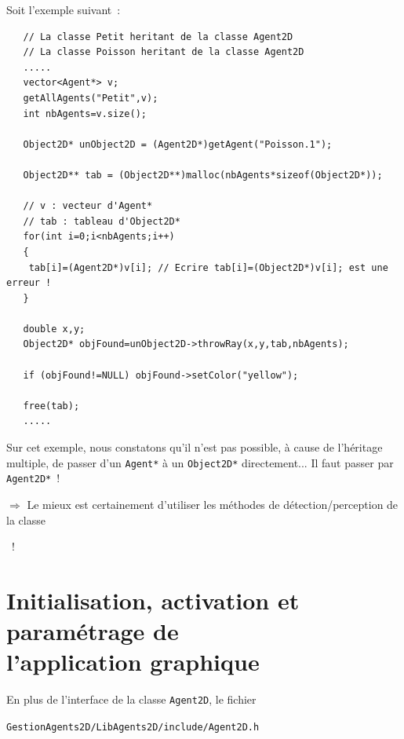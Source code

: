 \documentclass[12pt]{article}
\begin{document}
\newpage

Soit l'exemple suivant~:

\begin{small}
\begin{verbatim}
   // La classe Petit heritant de la classe Agent2D
   // La classe Poisson heritant de la classe Agent2D
   .....
   vector<Agent*> v;
   getAllAgents("Petit",v);
   int nbAgents=v.size();

   Object2D* unObject2D = (Agent2D*)getAgent("Poisson.1");

   Object2D** tab = (Object2D**)malloc(nbAgents*sizeof(Object2D*));

   // v : vecteur d'Agent*
   // tab : tableau d'Object2D*
   for(int i=0;i<nbAgents;i++)
   {
    tab[i]=(Agent2D*)v[i]; // Ecrire tab[i]=(Object2D*)v[i]; est une erreur !
   }

   double x,y;
   Object2D* objFound=unObject2D->throwRay(x,y,tab,nbAgents);

   if (objFound!=NULL) objFound->setColor("yellow");

   free(tab);
   .....
\end{verbatim}
\end{small}

Sur cet exemple, nous constatons qu'il n'est pas possible, \`a cause
de l'h\'eritage multiple, de passer d'un {\tt Agent*} \`a un {\tt Object2D*}
directement... Il faut passer par {\tt Agent2D*}~!

\vspace{0.3cm}
$\Longrightarrow$ Le mieux est certainement d'utiliser les m\'ethodes
de d\'etection/perception de la classe

\hspace{0.8cm}{\tt Agent2D}~!


\section{Initialisation, activation et param\'etrage de\\
         l'application graphique}

En plus de l'interface de la classe {\tt Agent2D},
le fichier

\vspace{-0.3cm}
\begin{center}
\verb!GestionAgents2D/LibAgents2D/include/Agent2D.h!
\end{center}
\end{document}
